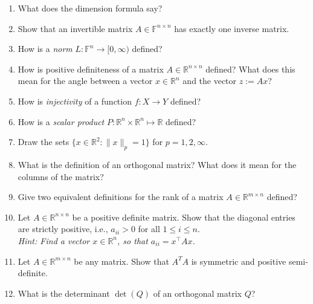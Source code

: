 \begin{enumerate}
	 \item What does the dimension formula say?
	 \item  Show that an invertible matrix $A\in\mathbb{F}^{n \times n}$ has exactly one inverse matrix.
	 \item How is a \textit{norm} $L: \mathbb{F}^n \to [0, \infty)$ defined?
	 \item How is positive definiteness of a matrix $A\in \mathbb{R}^{n \times n}$ defined? What does this mean for the angle
	 between a vector $x \in \mathbb{R}^{n}$ and the vector $z := Ax$?
	 \item How is \textit{injectivity} of a function $f\colon X \to Y$ defined?
	 	\item How is a \textit{scalar product} $P\colon \mathbb{R}^n \times \mathbb{R}^n \mapsto \mathbb{R}$ defined?
\item Draw the sets $\{x \in \mathbb{R}^{2} \colon \|x\|_p = 1   \}$ for $p=1,2,\infty$.
\item What is the definition of an orthogonal matrix? What does it mean for the columns of the matrix?
\item Give two equivalent definitions for the rank of a matrix $A \in \mathbb{R}^{m \times n}$ defined?
\item  Let $A \in \mathbb{R}^{n \times n}$ be a positive definite matrix. Show that the diagonal entries are strictly positive, i.e.,  $a_{ii} > 0$ for all $1\leq i\leq n$.\\
\textit{Hint: Find a vector $x\in\mathbb{R}^{n}$, so that $a_{ii}=x^\top A x$.}
\item Let $A \in  \mathbb{R}^{m \times n}$ be any matrix. Show that $A^TA$ is symmetric and positive semi-definite. 
\item What is the determinant $\det(Q)$ of an orthogonal matrix $Q$?

\end{enumerate}
 